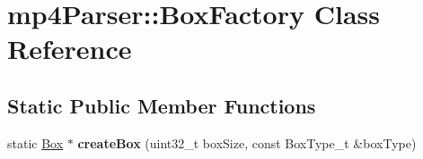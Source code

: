 \hypertarget{classmp4_parser_1_1_box_factory}{}\section{mp4\+Parser\+::Box\+Factory Class Reference}
\label{classmp4_parser_1_1_box_factory}
\subsection*{Static Public Member Functions}
\begin{DoxyCompactItemize}
\item 
\mbox{\label{classmp4_parser_1_1_box_factory_a12313efbb4a2ca00439723b88fef41fa}} 
static \mbox{\hyperlink{classmp4_parser_1_1_box}{Box}} $\ast$ {\bfseries create\+Box} (uint32\+\_\+t box\+Size, const Box\+Type\+\_\+t \&box\+Type)
\end{DoxyCompactItemize}
